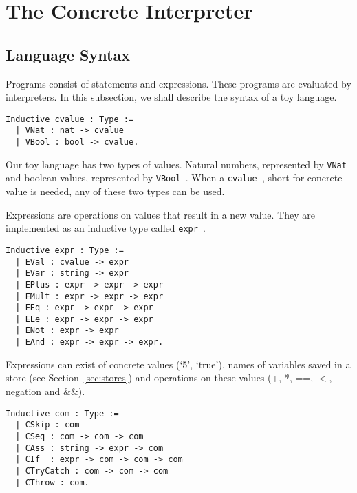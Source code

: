 \section{The Concrete Interpreter}

\subsection{Language Syntax}
\label{sec:lang}
Programs consist of statements and expressions. These programs are evaluated by
interpreters. In this subsection, we shall describe the syntax of a toy
language.

\begin{listing}
\begin{verbatim}
Inductive cvalue : Type :=
  | VNat : nat -> cvalue
  | VBool : bool -> cvalue.
\end{verbatim}
\end{listing}

Our toy language has two types of values. Natural numbers, represented by
\texttt{VNat } and boolean values, represented by \texttt{VBool }. 
When a \texttt{cvalue }, short for concrete value is needed, any of
these two types can be used.

Expressions are operations on values that result in a new value. They are
implemented as an inductive type called \texttt{expr }. 

\begin{listing}
\begin{verbatim}
Inductive expr : Type :=
  | EVal : cvalue -> expr
  | EVar : string -> expr
  | EPlus : expr -> expr -> expr
  | EMult : expr -> expr -> expr
  | EEq : expr -> expr -> expr
  | ELe : expr -> expr -> expr
  | ENot : expr -> expr
  | EAnd : expr -> expr -> expr.
\end{verbatim}
\end{listing}

Expressions can exist of concrete values (`5', `true'), names of variables
saved in a store (see Section~\ref{sec:stores}) and operations on these values
(+, *, ==, $<$, negation and $\&\&$). 

\begin{listing}
\begin{verbatim}
Inductive com : Type :=
  | CSkip : com
  | CSeq : com -> com -> com
  | CAss : string -> expr -> com
  | CIf  : expr -> com -> com -> com
  | CTryCatch : com -> com -> com
  | CThrow : com. 
\end{verbatim}
\end{listing}

